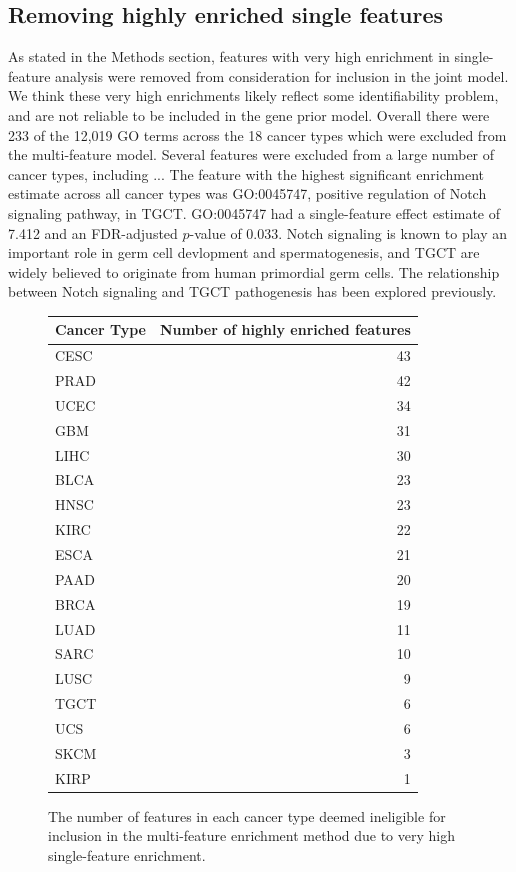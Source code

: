\subsection{Removing highly enriched single features}\label{sec:org530c0fc}

As stated in the Methods section, features with very high enrichment in single-feature analysis were removed from consideration for inclusion in the joint model. We think these very high enrichments likely reflect some identifiability problem, and are not reliable to be included in the gene prior model.  
Overall there were 233 of the 12,019 GO terms across the 18 cancer types which were excluded from the multi-feature model. Several features were excluded from a large number of cancer types, including ... %
The feature with the highest significant enrichment estimate across all cancer types was GO:0045747, positive regulation of Notch signaling pathway, in TGCT.  GO:0045747 had a single-feature effect estimate of 7.412 and an FDR-adjusted $p$-value of 0.033.  Notch signaling is known to play an important role in germ cell devlopment and spermatogenesis\cite{Huang_2013}, and TGCT are widely believed to originate from human primordial germ cells\cite{baroni19_origin_testic_germ_cell_tumor}.  The relationship between Notch signaling and TGCT pathogenesis has been explored previously\cite{hayashi04_expres_failur_notch_signal_system}.

\begin{figure}
    \centering
\begin{tabular}{l|r}
  \hline
  Cancer Type & Number of highly enriched features\\
  \hline
  CESC & 43\\
  \hline
  PRAD & 42\\
  \hline
  UCEC & 34\\
  \hline
  GBM & 31\\
  \hline
  LIHC & 30\\
  \hline
  BLCA & 23\\
  \hline
  HNSC & 23\\
  \hline
  KIRC & 22\\
  \hline
  ESCA & 21\\
  \hline
  PAAD & 20\\
  \hline
  BRCA & 19\\
  \hline
  LUAD & 11\\
  \hline
  SARC & 10\\
  \hline
  LUSC & 9\\
  \hline
  TGCT & 6\\
  \hline
  UCS & 6\\
  \hline
  SKCM & 3\\
  \hline
  KIRP & 1\\
  \hline
\end{tabular}\label{fig:n_enriched}
    \caption{The number of features in each cancer type deemed ineligible for inclusion in the multi-feature enrichment method due to very high single-feature enrichment.}
\end{figure}


